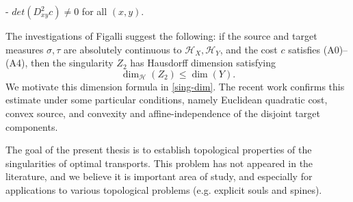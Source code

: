 \documentclass[12pt]{amsart}
\theoremstyle{definition}
\theoremstyle{remark}
\begin{document}
- $det(D_{xy}^2 c) \neq 0$ for all $(x,y)$. 

The investigations of Figalli suggest the following: if the source and target measures $\sigma, \tau$ are absolutely continuous to $\mathscr{H}_X, \mathscr{H}_Y$, and the cost $c$ satisfies (A0)--(A4), then the singularity $Z_2$ has Hausdorff dimension satisfying $$\dim_{\mathscr{H}} (Z_2)\leq \dim(Y).$$ We motivate this dimension formula in \ref{sing-dim}. The recent work \cite{KitMc} confirms this estimate under some particular conditions, namely Euclidean quadratic cost, convex source, and convexity and affine-independence of the disjoint target components.

The goal of the present thesis is to establish topological properties of the singularities of optimal transports. This problem has not appeared in the literature, and we believe it is important area of study, and especially for applications to various topological problems (e.g. explicit souls and spines). 
















\printbibliography[title={References}]
\end{document}
